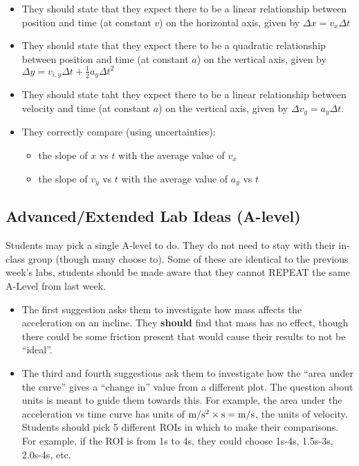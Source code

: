 \documentclass[fleqn,letterpaper]{article}
\begin{document}
\begin{enumerate}
{\begin{itemize}
   \item{They should state that they expect there to be a linear relationship between position and time (at constant $v$) on the horizontal axis, given by $\Delta x = v_x \Delta t$}
   \item{They should state that they expect there to be a quadratic relationship between position and time (at constant $a$) on the vertical axis, given by $\Delta y = v_{i,y} \Delta t + \frac{1}{2}a_y \Delta t^2$}
   \item{They should state taht they expect there to be a linear relationship between velocity and time (at constant $a$) on the vertical axis, given by $\Delta v_y = a_y \Delta t$.}
   \item{They correctly compare (using uncertainties):
    \begin{itemize}
    \item{the slope of $x$ vs $t$ with the average value of $v_x$}
    \item{the slope of $v_y$ vs $t$ with the average value of $a_y$ vs $t$}
    \end{itemize}}
  \end{itemize}
}
\end{enumerate}


\subsection*{Advanced/Extended Lab Ideas (A-level)}

Students may pick a single A-level to do.  They do not need to stay with their in-class group (though many choose to).  Some of these are identical to the previous week's labs, students should be made aware that they cannot REPEAT the same A-Level from last week.

\begin{itemize}
 \item{The first suggestion asks them to investigate how mass affects the acceleration on an incline.  They \textbf{should} find that mass has no effect, though there could be some friction present that would cause their results to not be ``ideal''.}
 \item{The third and fourth suggestions ask them to investigate how the ``area under the curve'' gives a ``change in'' value from a different plot.  The question about units is meant to guide them towards this.  For example, the area under the acceleration vs time curve has units of ${\rm m/s^2} \times {\rm s} = \rm{m/s}$, the units of velocity.  Students should pick 5 different ROIs in which to make their comparisons.  For example, if the ROI is from 1s to 4s, they could choose 1s-4s, 1.5s-3s, 2.0s-4s, etc.}
\end{itemize}
\end{document}
